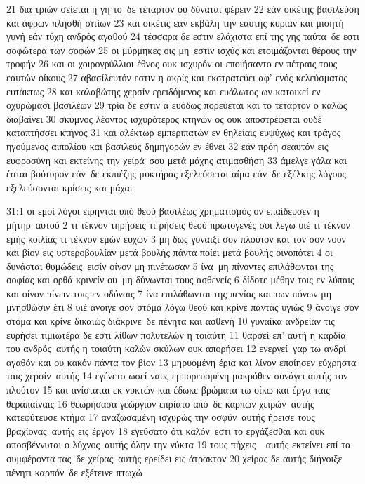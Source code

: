 \documentclass[10pt,oneside,footinclude=true,headinclude=true]{scrbook} %
\begin{document}
21 διά τριών σείεται η γη το δε τέταρτον ου δύναται φέρειν
22 εάν οικέτης βασιλεύση και άφρων πλησθή σιτίων
23 και οικέτις εάν εκβάλη την εαυτής κυρίαν και μισητή γυνή εάν τύχη ανδρός αγαθού
24 τέσσαρα δε εστιν ελάχιστα επί της γης ταύτα δε εστι σοφώτερα των σοφών
25 οι μύρμηκες οις μη εστιν ισχύς και ετοιμάζονται θέρους την τροφήν
26 και οι χοιρογρύλλιοι έθνος ουκ ισχυρόν οι εποιήσαντο εν πέτραις τους εαυτών οίκους
27 αβασίλευτόν εστιν η ακρίς και εκστρατεύει αφ' ενός κελεύσματος ευτάκτως
28 και καλαβώτης χερσίν ερειδόμενος και ευάλωτος ων κατοικεί εν οχυρώμασι βασιλέων
29 τρία δε εστιν α ευόδως πορεύεται και το τέταρτον ο καλώς διαβαίνει
30 σκύμνος λέοντος ισχυρότερος κτηνών ος ουκ αποστρέφεται ουδέ καταπτήσσει κτήνος
31 και αλέκτωρ εμπεριπατών εν θηλείαις ευψύχως και τράγος ηγούμενος αιπολίου και βασιλεύς δημηγορών εν έθνει
32 εάν πρόη σεαυτόν εις ευφροσύνη και εκτείνης την χείρά σου μετά μάχης ατιμασθήση
33 άμελγε γάλα και έσται βούτυρον εάν δε εκπιέζης μυκτήρας εξελεύσεται αίμα εάν δε εξέλκης λόγους εξελεύσονται κρίσεις και μάχαι
\par
31:1 οι εμοί λόγοι είρηνται υπό θεού βασιλέως χρηματισμός ον επαίδευσεν η μήτηρ αυτού
2 τι τέκνον τηρήσεις τι ρήσεις θεού πρωτογενές σοι λεγω υιέ τι τέκνον εμής κοιλίας τι τέκνον εμών ευχών
3 μη δως γυναιξί σον πλούτον και τον σον νουν και βίον εις υστεροβουλίαν μετά βουλής πάντα ποίει μετά βουλής οινοπότει
4 οι δυνάσται θυμώδεις εισίν οίνον μη πινέτωσαν
5 ίνα μη πίνοντες επιλάθωνται της σοφίας και ορθά κρινείν ου μη δύνωνται τους ασθενείς
6 δίδοτε μέθην τοις εν λύπαις και οίνον πίνειν τοις εν οδύναις
7 ίνα επιλάθωνται της πενίας και των πόνων μη μνησθώσιν έτι
8 υιέ άνοιγε σον στόμα λόγω θεού και κρίνε πάντας υγιώς
9 άνοιγε σον στόμα και κρίνε δικαιώς διάκρινε δε πένητα και ασθενή
10 γυναίκα ανδρείαν τις ευρήσει τιμιωτέρα δε εστι λίθων πολυτελών η τοιαύτη
11 θαρσεί επ' αυτή η καρδία του ανδρός αυτής η τοιαύτη καλών σκύλων ουκ απορήσει
12 ενεργεί γαρ τω ανδρί αγαθόν και ου κακόν πάντα τον βίον
13 μηρυομένη έρια και λίνον εποίησεν εύχρηστα ταις χερσίν αυτής
14 εγένετο ωσεί ναυς εμπορευομένη μακρόθεν συνάγει αυτής τον πλούτον
15 και ανίσταται εκ νυκτών και έδωκε βρώματα τω οίκω και έργα ταις θεραπαίναις
16 θεωρήσασα γεώργιον επρίατο από δε καρπών χειρών αυτής κατεφύτευσε κτήμα
17 αναζωσαμένη ισχυρώς την οσφύν αυτής ήρεισε τους βραχίονας αυτής εις έργον
18 εγεύσατο ότι καλόν εστι το εργάζεσθαι και ουκ αποσβέννυται ο λύχνος αυτής όλην την νύκτα
19 τους πήχεις  αυτής εκτείνει επί τα συμφέροντα τας δε χείρας αυτής ερείδει εις άτρακτον
20 χείρας δε αυτής διήνοιξε πένητι καρπόν δε εξέτεινε πτωχώ
\end{document}

